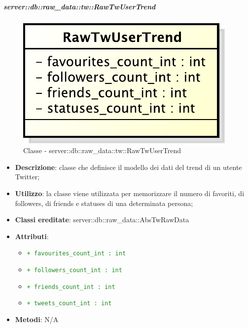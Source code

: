 		\subparagraph{server::db::raw\_data::tw::RawTwUserTrend} %
		\label{subp:server_db_raw_data_tw_rawigusertrend}
			\begin{figure}[htbp]
				\centering
				\centerline{\includegraphics[scale=0.75]{./images/server/classes/db/raw_tw_user_trend.pdf}}
				\caption{Classe - server::db::raw\_data::tw::RawTwUserTrend}
			\end{figure}
			\begin{itemize}
				\item \textbf{Descrizione}: classe che definisce il modello dei dati del trend di un utente Twitter;
				\item \textbf{Utilizzo}: la classe viene utilizzata per memorizzare il numero di favoriti, di followers, di friends e statuses di una determinata persona;
				\item \textbf{Classi ereditate}: server::db::raw\_data::AbsTwRawData
				\item \textbf{Attributi}:
					\begin{itemize}
						\item \textcolor{forestgreen}{\texttt{+ favourites\_count\_int : int}}
						\item \textcolor{forestgreen}{\texttt{+ followers\_count\_int : int}}
						\item \textcolor{forestgreen}{\texttt{+ friends\_count\_int : int}}
						\item \textcolor{forestgreen}{\texttt{+ tweets\_count\_int : int}}
					\end{itemize}
				\item \textbf{Metodi}: N/A
			\end{itemize}



